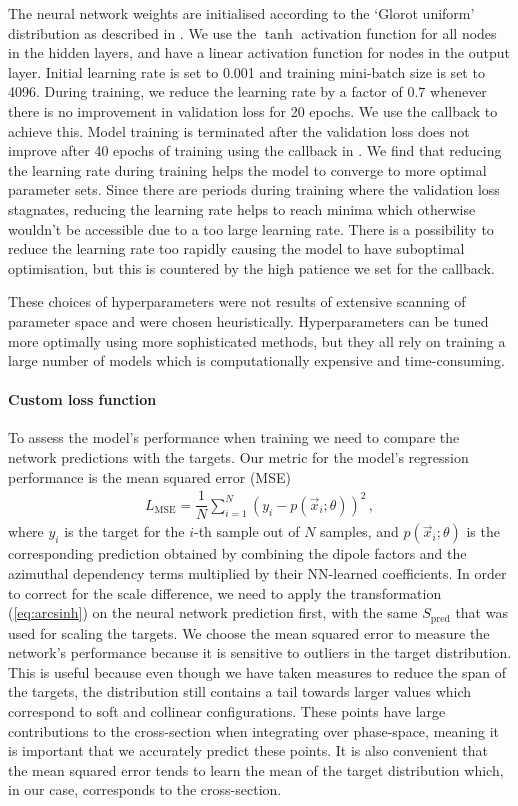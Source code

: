 \documentclass[main.tex]{subfiles}
\begin{document}
The neural network weights are initialised according to the `Glorot uniform' distribution as described in \cite{pmlr-v9-glorot10a}.
We use the $\tanh$ activation function for all nodes in the hidden layers, and have a linear activation function for nodes in the output layer.
Initial learning rate is set to 0.001 and training mini-batch size is set to 4096.
During training, we reduce the learning rate by a factor of $0.7$ whenever there is no improvement in validation loss for 20 epochs.
We use the {\Keras} callback {\ReduceLROnPlateau} to achieve this.
Model training is terminated after the validation loss does not improve after 40 epochs of training using the {\EarlyStopping} callback in {\Keras}.
We find that reducing the learning rate during training helps the model to converge to more optimal parameter sets.
Since there are periods during training where the validation loss stagnates, reducing the learning rate helps to reach minima which otherwise wouldn't be accessible due to a too large learning rate.
There is a possibility to reduce the learning rate too rapidly causing the model to have suboptimal optimisation, but this is countered by the high patience we set for the {\ReduceLROnPlateau} callback.

These choices of hyperparameters were not results of extensive scanning of parameter space and were chosen heuristically.
Hyperparameters can be tuned more optimally using more sophisticated methods, but they all rely on training a large number of models which is computationally expensive and time-consuming.

\paragraph*{Custom loss function}
To assess the model's performance when training we need to compare the network predictions with the targets. Our metric for the model's regression performance is the mean squared error (MSE)
\begin{eqnarray}\label{eq:mse}
    L_{\mathrm{MSE}} = \dfrac{1}{N} \sum_{i=1}^{N} \left(y_{i} - p(\vec{x}_{i}; \theta)\right)^{2} \, ,
\end{eqnarray}
where $y_{i}$ is the target for the $i$-th sample out of $N$ samples, and $p(\vec{x}_{i}; \theta)$ is the corresponding prediction
obtained by combining the dipole factors and the azimuthal dependency terms multiplied by their NN-learned coefficients. 
In order to correct for the scale difference, we need to apply the transformation (\ref{eq:arcsinh}) on the neural network prediction first, with the same $S_{\mathrm{pred}}$ that was used for scaling the targets.
We choose the mean squared error to measure the network's performance because it is sensitive to outliers in the target distribution.
This is useful because even though we have taken measures to reduce the span of the targets, the distribution still contains a tail towards larger values which correspond to soft and collinear configurations.
These points have large contributions to the cross-section when integrating over phase-space, meaning it is important that we accurately predict these points.
It is also convenient that the mean squared error tends to learn the mean of the target distribution which, in our case, corresponds to the cross-section.
\end{document}
